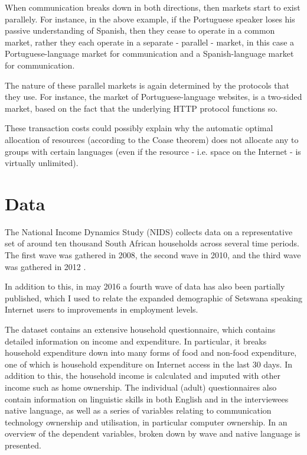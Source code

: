 \documentclass[a4paper,british]{article}\usepackage[]{graphicx}\usepackage[]{color}
\begin{document}
When communication breaks down in both directions, then markets start
to exist parallely. For instance, in the above example, if the Portuguese
speaker loses his passive understanding of Spanish, then they cease
to operate in a common market, rather they each operate in a separate
- parallel - market, in this case a Portuguese-language market for
communication and a Spanish-language market for communication.

The nature of these parallel markets is again determined by the protocols
that they use. For instance, the market of Portuguese-language websites,
is a two-sided market, based on the fact that the underlying HTTP
protocol functions so.

These transaction costs could possibly explain why the automatic optimal
allocation of resources (according to the Coase theorem) does not
allocate any to groups with certain languages (even if the resource
- i.e. space on the Internet - is virtually unlimited).

\section{Data}

\label{sec:data}The National Income Dynamics Study (NIDS) collects
data on a representative set of around ten thousand South African
households across several time periods. The first wave was gathered
in 2008, the second wave in 2010, and the third wave was gathered
in 2012 \citep{saldru2008nids,saldru2012nids,saldru2013nids}.

In addition to this, in may 2016 a fourth wave of data has also been
partially published, which I used to relate the expanded demographic
of Setswana speaking Internet users to improvements in employment
levels.

The dataset contains an extensive household questionnaire, which contains
detailed information on income and expenditure. In particular, it
breaks household expenditure down into many forms of food and non-food
expenditure, one of which is household expenditure on Internet access
in the last 30 days. In addition to this, the household income is
calculated and imputed with other income such as home ownership. The
individual (adult) questionnaires also contain information on linguistic
skills in both English and in the interviewees native language, as
well as a series of variables relating to communication technology
ownership and utilisation, in particular computer ownership. In 
an overview of the dependent variables, broken down by wave and native
language is presented.
\end{document}
